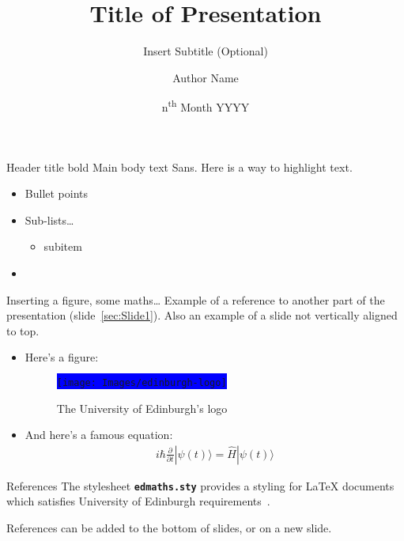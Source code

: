 \documentclass{beamer}
\title[Insert Title (short version of title)]{Title of Presentation}
\subtitle{Insert Subtitle (Optional)}  %
\author{Author Name}
\date{n\textsuperscript{th} Month YYYY}
\begin{document}
\begin{frame}
    \titlepage{}
\end{frame}


\begin{frame}[t]{Header title bold}\label{sec:Slide1}
    Main body text Sans. Here is a way to \alert{highlight text}.
    \begin{itemize}
    \item Bullet points
    \item Sub-lists\ldots
        \begin{itemize}
            \item subitem
        \end{itemize}
    \item \lipsum[2]
    \end{itemize}
\end{frame}


\begin{frame}{Inserting a figure, some maths\ldots}
    Example of a reference to another part of the presentation (slide~\ref{sec:Slide1}). Also an example of a slide not vertically aligned to top.\newline

    \begin{itemize}
        \item Here's a figure:
            \begin{figure}[h]
                \centering
                \colorbox{blue}{\texttt{[image: Images/edinburgh-logo]}}
                \caption{The University of Edinburgh's logo}\label{fig:edinburgh-logo}
            \end{figure}
        \item And here's a famous equation:
            \begin{eqnarray}
                \label{eq:schroedinger}
                i\hbar {\frac{\partial}{\partial t}}|\psi (t)\rangle ={\hat{H}}|\psi (t)\rangle
            \end{eqnarray}
    \end{itemize}
\end{frame}


\begin{frame}[t]{References}
    The stylesheet {\bf\texttt{edmaths.sty}} provides a styling for LaTeX{} documents which satisfies University of Edinburgh requirements~\cite{koeppe2007}. \newline        

    \lipsum[4]\newline

    References can be added to the bottom of slides, or on a new slide.
    \vfill 
    
    
\end{frame}
\end{document}
